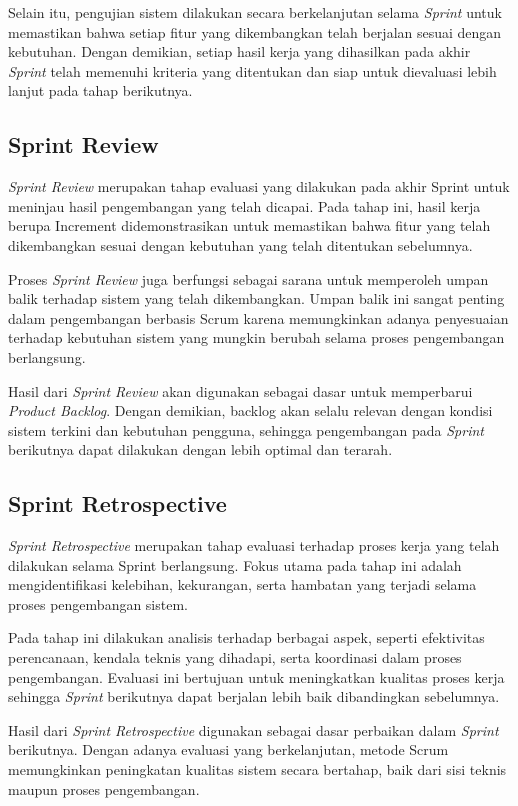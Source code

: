 		Selain itu, pengujian sistem dilakukan secara berkelanjutan selama \textit{Sprint} untuk memastikan bahwa setiap fitur yang dikembangkan telah berjalan sesuai dengan kebutuhan. Dengan demikian, setiap hasil kerja yang dihasilkan pada akhir \textit{Sprint} telah memenuhi kriteria yang ditentukan dan siap untuk dievaluasi lebih lanjut pada tahap berikutnya.


		\subsection{Sprint Review}
		\textit{Sprint Review} merupakan tahap evaluasi yang dilakukan pada akhir Sprint untuk meninjau hasil pengembangan yang telah dicapai. Pada tahap ini, hasil kerja berupa Increment didemonstrasikan untuk memastikan bahwa fitur yang telah dikembangkan sesuai dengan kebutuhan yang telah ditentukan sebelumnya.

		Proses \textit{Sprint Review} juga berfungsi sebagai sarana untuk memperoleh umpan balik terhadap sistem yang telah dikembangkan. Umpan balik ini sangat penting dalam pengembangan berbasis Scrum karena memungkinkan adanya penyesuaian terhadap kebutuhan sistem yang mungkin berubah selama proses pengembangan berlangsung.

		Hasil dari \textit{Sprint Review} akan digunakan sebagai dasar untuk memperbarui \textit{Product Backlog}. Dengan demikian, backlog akan selalu relevan dengan kondisi sistem terkini dan kebutuhan pengguna, sehingga pengembangan pada \textit{Sprint} berikutnya dapat dilakukan dengan lebih optimal dan terarah.

		\subsection{Sprint Retrospective}
		\textit{Sprint Retrospective} merupakan tahap evaluasi terhadap proses kerja yang telah dilakukan selama Sprint berlangsung. Fokus utama pada tahap ini adalah mengidentifikasi kelebihan, kekurangan, serta hambatan yang terjadi selama proses pengembangan sistem.

		Pada tahap ini dilakukan analisis terhadap berbagai aspek, seperti efektivitas perencanaan, kendala teknis yang dihadapi, serta koordinasi dalam proses pengembangan. Evaluasi ini bertujuan untuk meningkatkan kualitas proses kerja sehingga \textit{Sprint} berikutnya dapat berjalan lebih baik dibandingkan sebelumnya.

		Hasil dari \textit{Sprint Retrospective} digunakan sebagai dasar perbaikan dalam \textit{Sprint} berikutnya. Dengan adanya evaluasi yang berkelanjutan, metode Scrum memungkinkan peningkatan kualitas sistem secara bertahap, baik dari sisi teknis maupun proses pengembangan.

